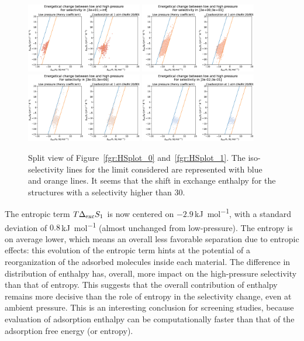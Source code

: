 \documentclass[main.tex]{subfiles}
\begin{document}
 
\begin{figure}[ht]
  \centering
    \includegraphics[width=0.45\textwidth]{figures/2-thermo/H_S_0.jpg}
    \includegraphics[width=0.45\textwidth]{figures/2-thermo/H_S_1.jpg}
    \includegraphics[width=0.45\textwidth]{figures/2-thermo/H_S_2.jpg}
    \includegraphics[width=0.45\textwidth]{figures/2-thermo/H_S_3.jpg}
    \caption{Split view of Figure~\ref{fgr:HSplot_0} and~\ref{fgr:HSplot_1}. The iso-selectivity lines for the limit considered are represented with blue and orange lines. It seems that the shift in exchange enthalpy for the structures with a selectivity higher than $30$.}\label{fgr:SI:HS_split}
\end{figure}

The entropic term $T\Delta_{\text{exc}}S_{\text{1}}$ is now centered on $-2.9$\,\si{\kilo\joule\per\mol}, with a standard deviation of $0.8$\,\si{\kilo\joule\per\mol} (almost unchanged from low-pressure). The entropy is on average lower, which means an overall less favorable separation due to entropic effects: this evolution of the entropic term hints at the potential of a reorganization of the adsorbed molecules inside each material. The difference in distribution of enthalpy has, overall, more impact on the high-pressure selectivity than that of entropy. This suggests that the overall contribution of enthalpy remains more decisive than the role of entropy in the selectivity change, even at ambient pressure. This is an interesting conclusion for screening studies, because evaluation of adsorption enthalpy can be computationally faster than that of the adsorption free energy (or entropy).
\end{document}

